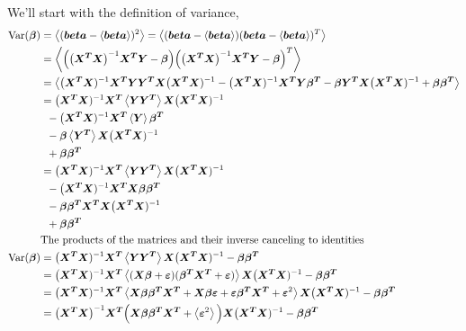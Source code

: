 \documentclass[10pt]{revtex4-2}
\begin{document}
We'll start with the definition of variance, 
\begin{align}
	\mbox{Var}(\bm{\beta}) &= \expval{ ( \bm{beta} - \expval{\bm{beta}} )^2 }
		= \expval{( \bm{beta} - \expval{\bm{beta}} )
			( \bm{beta} - \expval{\bm{beta}} )^T } \\
	&= \expval{\Big( \big( \bm{X^T}\bm{X} \big)^{-1} \bm{X^T} \bm{Y} 
			- \bm{\beta}\Big) 
		\Big( \big( \bm{X^T}\bm{X} \big)^{-1} \bm{X^T} \bm{Y}  
			- \bm{\beta} \Big)^T } \\
	&= \expval{ \big(\bm{X^T}\bm{X})^{-1}\bm{X^T}\bm{Y}
			\bm{Y^T}\bm{X}\big(\bm{X^T}\bm{X})^{-1}
		- \big(\bm{X^T}\bm{X})^{-1}\bm{X^T}\bm{Y}\bm{\beta^T}
		- \bm{\beta}\bm{Y^T}\bm{X}\big(\bm{X^T}\bm{X})^{-1}
		+ \bm{\beta}\bm{\beta^T} } \\
	&= \big(\bm{X^T}\bm{X})^{-1}\bm{X^T}\expval{\bm{Y}\bm{Y^T}}
			\bm{X}\big(\bm{X^T}\bm{X})^{-1} \\
	&\;\;	- \big(\bm{X^T}\bm{X})^{-1}\bm{X^T}\expval{\bm{Y}}\bm{\beta^T} \\
	&\;\;	- \bm{\beta}\expval{\bm{Y^T}}\bm{X}\big(\bm{X^T}\bm{X})^{-1} \\
	&\;\;	+ \bm{\beta}\bm{\beta^T} \\
	&= \big(\bm{X^T}\bm{X})^{-1}\bm{X^T}\expval{\bm{Y}\bm{Y^T}}
			\bm{X}\big(\bm{X^T}\bm{X})^{-1} \\
	&\;\;	- \big(\bm{X^T}\bm{X})^{-1}\bm{X^T}\bm{X}\bm{\beta}\bm{\beta^T} \\
	&\;\;	- \bm{\beta}\bm{\beta^T}\bm{X^T}\bm{X}\big(\bm{X^T}\bm{X})^{-1} \\
	&\;\;	+ \bm{\beta}\bm{\beta^T} \\
	&\text{The products of the matrices and their inverse canceling to identities}
		\nonumber \\
	\mbox{Var}(\bm{\beta}) &= \big(\bm{X^T}\bm{X})^{-1}\bm{X^T}\expval{\bm{Y}\bm{Y^T}}
			\bm{X}\big(\bm{X^T}\bm{X})^{-1} 
		- \bm{\beta}\bm{\beta^T} \\
	&=	\big(\bm{X^T}\bm{X})^{-1}\bm{X^T}
		\expval{(\bm{X}\bm{\beta} + \bm{\varepsilon})
				(\bm{\beta^T}\bm{X^T} + \bm{\varepsilon})}
			\bm{X}\big(\bm{X^T}\bm{X})^{-1}
	 	- \bm{\beta}\bm{\beta^T} \\
	&=  \big(\bm{X^T}\bm{X})^{-1}\bm{X^T}
		\expval{
			\bm{X}\bm{\beta}\bm{\beta^T}\bm{X^T}
			+ \bm{X}\bm{\beta}\bm{\varepsilon}
			+ \bm{\varepsilon}\bm{\beta^T}\bm{X^T}
			+ \bm{\varepsilon}^2
		}
		\bm{X}\big(\bm{X^T}\bm{X})^{-1}
		- \bm{\beta}\bm{\beta^T} \\
	&=	 \big(\bm{X^T}\bm{X}\big)^{-1}\bm{X^T}
			\Big(\bm{X}\bm{\beta}\bm{\beta^T}\bm{X^T} 
				+ \expval{\bm{\varepsilon}^2} \Big)
			\bm{X}\big(\bm{X^T}\bm{X})^{-1}
		- \bm{\beta}\bm{\beta^T}
\end{align}
\end{document}
